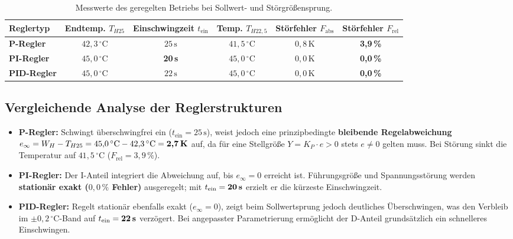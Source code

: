 \documentclass[a4paper,10pt,department=FakEI]{OTHRartcl}
\begin{document}
\begin{table}[H]
\centering
\small
\caption{Messwerte des geregelten Betriebs bei Sollwert- und Störgrößensprung.}
\label{tab:reglervergleich}
\begin{tabular*}{\textwidth}{@{\extracolsep{\fill}}lccccc@{}}
\toprule
\textbf{Reglertyp} & \textbf{Endtemp. $T_{H25}$} & \textbf{Einschwingzeit $t_{\text{ein}}$} & \textbf{Temp. $T_{H22{,}5}$} & \textbf{Störfehler $F_{\text{abs}}$} & \textbf{Störfehler $F_{\text{rel}}$} \\
\midrule
\textbf{P-Regler}   & $42{,}3\,^\circ\text{C}$ & $25\,\text{s}$ & $41{,}5\,^\circ\text{C}$ & $0{,}8\,\text{K}$ & \textbf{3,9\,\%} \\
\textbf{PI-Regler}  & $45{,}0\,^\circ\text{C}$ & \textbf{20\,s} & $45{,}0\,^\circ\text{C}$ & $0{,}0\,\text{K}$ & \textbf{0,0\,\%} \\
\textbf{PID-Regler} & $45{,}0\,^\circ\text{C}$ & $22\,\text{s}$ & $45{,}0\,^\circ\text{C}$ & $0{,}0\,\text{K}$ & \textbf{0,0\,\%} \\
\bottomrule
\end{tabular*}
\end{table}

\subsection{Vergleichende Analyse der Reglerstrukturen}
\begin{itemize}
    \item \textbf{P-Regler:} Schwingt überschwingfrei ein ($t_{\text{ein}} = 25\,\text{s}$), weist jedoch eine prinzipbedingte \textbf{bleibende Regelabweichung} $e_{\infty} = W_H - T_{H25} = 45{,}0\,^\circ\text{C} - 42{,}3\,^\circ\text{C} = \textbf{2,7\,K}$ auf, da für eine Stellgröße $Y = K_P \cdot e > 0$ stets $e \neq 0$ gelten muss. Bei Störung sinkt die Temperatur auf $41{,}5\,^\circ\text{C}$ ($F_{\text{rel}} = 3{,}9\,\%$).
    \item \textbf{PI-Regler:} Der I-Anteil integriert die Abweichung auf, bis $e_{\infty} = 0$ erreicht ist. Führungsgröße und Spannungsstörung werden \textbf{stationär exakt ($0{,}0\,\%$ Fehler)} ausgeregelt; mit $t_{\text{ein}} = \textbf{20\,s}$ erzielt er die kürzeste Einschwingzeit.
    \item \textbf{PID-Regler:} Regelt stationär ebenfalls exakt ($e_{\infty} = 0$), zeigt beim Sollwertsprung jedoch deutliches Überschwingen, was den Verbleib im $\pm 0{,}2\,^\circ\text{C}$-Band auf $t_{\text{ein}} = \textbf{22\,s}$ verzögert. Bei angepasster Parametrierung ermöglicht der D-Anteil grundsätzlich ein schnelleres Einschwingen.
\end{itemize}
\end{document}
